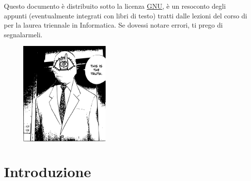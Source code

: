 \documentclass[10pt, letterpaper]{report}
\begin{document}
\newpage
\pagecolor{cartaRiciclata}%
Questo documento è distribuito sotto la licenza 
\color{blue}\href{https://www.gnu.org/licenses/fdl-1.3.txt}{GNU}\color{black},  
è un resoconto degli appunti (eventualmente integrati con libri di testo) tratti dalle lezioni del corso di \jobname
\hphantom{a}per la laurea 
triennale in Informatica. Se dovessi notare errori, ti prego di segnalarmeli.
\vfill
\begin{figure}[h!]
    \raggedright
    \includegraphics[width=0.4\textwidth,right ]{../../../preamble/tomodachi.pdf} 
\end{figure}
\newpage %
\normalsize
\tableofcontents 
\newpage

\fancyhf{}
\fancyhead[L]{\nouppercase{\leftmark}}
\fancyfoot[C]{\thepage}



\chapter{Introduzione}
\end{document}
